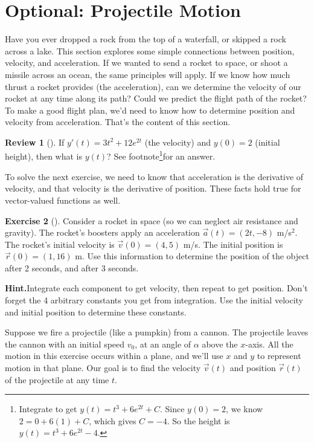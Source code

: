 \documentclass[10pt,]{book}
\theoremstyle{plain}
\theoremstyle{definition}
\theoremstyle{definition}
\theoremstyle{definition}
\newtheorem{project}{Review}[section]
\theoremstyle{definition}
\newtheorem{exploration}[project]{Exercise}
\theoremstyle{definition}
\numberwithin{equation}{section}
\begin{document}
\section[{Optional: Projectile Motion}]{Optional: Projectile Motion}\label{ch08_01_projmotion}
Have you ever dropped a rock from the top of a waterfall, or skipped a rock across a lake. This section explores some simple connections between position, velocity, and acceleration. If we wanted to send a rocket to space, or shoot a missile across an ocean, the same principles will apply. If we know how much thrust a rocket provides (the acceleration), can we determine the velocity of our rocket at any time along its path? Could we predict the flight path of the rocket? To make a good flight plan, we'd need to know how to determine position and velocity from acceleration. That's the content of this section.%
\begin{project}[]\label{project-7}
If \(y'(t) = 3t^2+12e^{2t}\) (the velocity) and \(y(0)=2\) (initial height), then what is \(y(t)\)? See footnote\footnote{Integrate to get \(y(t) = t^3+6e^{2t}+C\). Since \(y(0)=2\), we know \(2=0+6(1)+C\), which gives \(C=-4\). So the height is \(y(t) = t^3+6e^{2t}-4\).\label{fn-6}}for an answer.%
\end{project}
To solve the next exercise, we need to know that acceleration is the derivative of velocity, and that velocity is the derivative of position. These facts hold true for vector-valued functions as well.%
\begin{exploration}[]\label{exploration-158}
Consider a rocket in space (so we can neglect air resistance and gravity). The rocket's boosters apply an acceleration \(\vec a(t) = (2t,-8)\) m/s\(^2\). The rocket's initial velocity is \(\vec v(0) = (4,5)\) m/s. The initial position is \(\vec r(0) = (1,16)\) m. Use this information to determine the position of the object after 2 seconds, and after 3 seconds.%
\par\medskip\noindent%
\textbf{Hint.}\quad Integrate each component to get velocity, then repeat to get position. Don't forget the 4 arbitrary constants you get from integration. Use the initial velocity and initial position to determine these constants.%
\end{exploration}
Suppose we fire a projectile (like a pumpkin) from a cannon. The projectile leaves the cannon with an initial speed \(v_0\), at an angle of \(\alpha\) above the \(x\)-axis. All the motion in this exercise occurs within a plane, and we'll use \(x\) and \(y\) to represent motion in that plane. Our goal is to find the velocity \(\vec v(t)\) and position \(\vec r(t)\) of the projectile at any time \(t\).%
\end{document}
